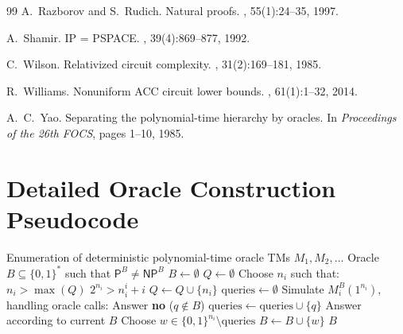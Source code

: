\documentclass[11pt,a4paper]{article}
\theoremstyle{plain}
\theoremstyle{definition}
\theoremstyle{remark}
\newcommand{\PP}{\mathsf{P}}
\newcommand{\NP}{\mathsf{NP}}
\newcommand{\bits}{\{0,1\}}
\newcommand{\bitsstar}{\{0,1\}^*}
\begin{document}
\begin{thebibliography}{99}
A.~Razborov and S.~Rudich.
\newblock Natural proofs.
, 55(1):24--35, 1997.

A.~Shamir.
\newblock IP = PSPACE.
, 39(4):869--877, 1992.

C.~Wilson.
\newblock Relativized circuit complexity.
, 31(2):169--181, 1985.

R.~Williams.
\newblock Nonuniform ACC circuit lower bounds.
, 61(1):1--32, 2014.

A.~C.~Yao.
\newblock Separating the polynomial-time hierarchy by oracles.
\newblock In {\em Proceedings of the 26th FOCS}, pages 1--10, 1985.

\end{thebibliography}

\appendix
\section{Detailed Oracle Construction Pseudocode}\label{app:pseudocode}

\begin{algorithm}[H]
\caption{Construction of Separation Oracle $B$}
\label{alg:oracleB}
\begin{algorithmic}[1]
\Require Enumeration of deterministic polynomial-time oracle TMs $M_1, M_2, \ldots$
\Ensure Oracle $B \subseteq \bitsstar$ such that $\PP^B \neq \NP^B$
\State $B \gets \emptyset$
\State $Q \gets \emptyset$ 
    \State Choose $n_i$ such that:
    \Statex \quad $n_i > \max(Q)$ 
    \Statex \quad $2^{n_i} > n_i^{i} + i$ 
    \State $Q \gets Q \cup \{n_i\}$
    \State $\text{queries} \gets \emptyset$
    \State Simulate $M_i^B(1^{n_i})$, handling oracle calls:
            \State Answer \textbf{no} ($q \notin B$)
            \State $\text{queries} \gets \text{queries} \cup \{q\}$
        \Else
            \State Answer according to current $B$
        \EndIf
    \EndFor
        \State {}
    \Else
        \State Choose $w \in \bits^{n_i} \setminus \text{queries}$ 
        \State $B \gets B \cup \{w\}$ 
    \EndIf
\EndFor
\Return $B$
\end{algorithmic}
\end{algorithm}
\end{document}
